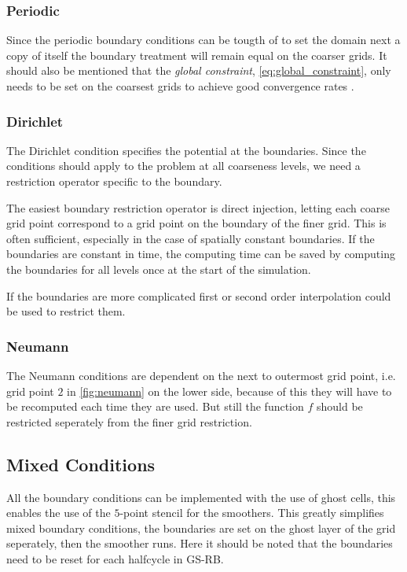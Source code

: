 	\subsubsection{Periodic}
		Since the periodic boundary conditions can be tougth of to set the domain next
		a copy of itself the boundary treatment will remain equal on the coarser
		grids. It should also be mentioned that the \textit{global constraint}, \cref{eq:global_constraint},
		only needs to be set on the coarsest grids to achieve good convergence
		rates \citep{trottenberg_multigrid_2000}.

	\subsubsection{Dirichlet}
		The Dirichlet condition specifies the potential at the boundaries. Since the conditions
		should apply to the problem at all coarseness levels, we need a restriction
		operator specific to the boundary.

		The easiest boundary restriction operator is direct injection, letting each
		coarse grid point correspond to a grid point on the boundary of the finer grid.
		This is often sufficient, especially in the case of spatially constant boundaries.
		If the boundaries are constant in time, the computing time can be saved by computing the boundaries for all levels
		once at the start of the simulation.

		If the boundaries are more complicated first or second order interpolation
		could be used to restrict them.

	\subsubsection{Neumann}
		The Neumann conditions are dependent on the next to outermost grid point,
		i.e. grid point \(2\) in \cref{fig:neumann} on the lower side,
		because of this they will have to be recomputed each time they are used.
		But still the function \(f\) should be restricted seperately from the
		finer grid restriction.


	\subsection{Mixed Conditions}
		All the boundary conditions can be implemented with the use of ghost cells,
		this enables the use of the \(5\)-point stencil for the smoothers. This
		greatly simplifies mixed boundary conditions, the boundaries are set on the
		ghost layer of the grid seperately, then the smoother runs. Here it should
		be noted that the boundaries need to be reset for each halfcycle in GS-RB.

